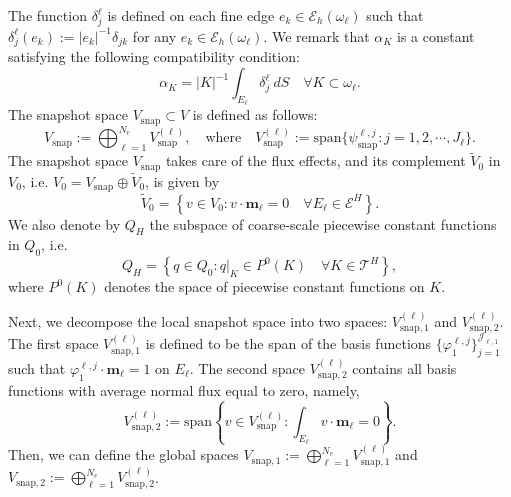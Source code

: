 \documentclass{article}[11pt]
\theoremstyle{definition}
\newcommand{\abs}[1]{\left |#1\right |}
\begin{document}
The function $\delta_j^\ell$ is defined on each fine edge $e_k \in \mathcal{E}_h(\omega_{\ell})$ such that $\delta_j^\ell (e_k) := \abs{e_k}^{-1} \delta_{jk}$ for any $e_k \in \mathcal{E}_h(\omega_\ell)$. 
We remark that $\alpha_K$ is a constant satisfying the following compatibility condition: 
$$ \alpha_K = \vert K \vert^{-1} \int_{E_\ell} \delta_j^\ell ~ dS \quad \forall K \subset \omega_\ell.$$
The snapshot space $V_{\text{snap}} \subset V$ is defined as follows:
$$ V_{\text{snap}} := \bigoplus_{\ell=1}^{N_e} V_{\text{snap}}^{(\ell)}, \quad \text{where} \quad 
V_{\text{snap}}^{(\ell)} := \text{span} \{ \psi_{\text{snap}}^{\ell,j} : j = 1, 2, \cdots, J_\ell \}.$$
The snapshot space $V_{\text{snap}}$ takes care of the flux effects, and its complement $\tilde{V}_0$ in $V_0$, i.e. $V_0 = V_{\text{snap}} \oplus \tilde{V}_0$, is given by 
$$ \tilde{V}_0 = \left\{ v \in V_0: v \cdot\mathbf{m}_\ell = 0 \quad  \forall E_\ell \in \mathcal{E}^H \right\}. $$
We also denote by $Q_H$ the subspace of coarse-scale piecewise constant functions in $Q_0$, i.e. 
$$
Q_H = \left\{ q \in Q_0 : q\vert_K \in P^0(K) \quad \forall K \in \mathcal{T}^H \right\},  
$$
where $P^0(K)$ denotes the space of piecewise constant functions on $K$. 


Next, we decompose the local snapshot space into two spaces: $V_{\text{snap},1}^{(\ell)}$ and $V_{\text{snap},2}^{(\ell)}$. The first space $V_{\text{snap},1}^{(\ell)}$ is defined to be the span of the basis functions $\{\varphi_{1}^{\ell,j}\}_{j=1}^{\mathcal{J}_{\ell,1}}$ such that $\varphi_{1}^{\ell,j} \cdot \mathbf{m}_{\ell} =1$ on $E_{\ell}$. The second space $V_{\text{snap},2}^{(\ell)}$ contains all basis functions with average normal flux equal to zero, namely, 
$$ V_{\text{snap},2}^{(\ell)} := \text{span} \left \{ v \in V_{\text{snap}}^{(\ell)} : \int_{E_\ell} v \cdot \mathbf{m}_{\ell} = 0 \right \}.$$
Then, we can define the global spaces $V_{\text{snap},1} := \bigoplus_{\ell = 1}^{N_e} V_{\text{snap},1}^{(\ell)}$ and $V_{\text{snap},2} := \bigoplus_{\ell = 1}^{N_e} V_{\text{snap},2}^{(\ell)}$. 
\end{document}
